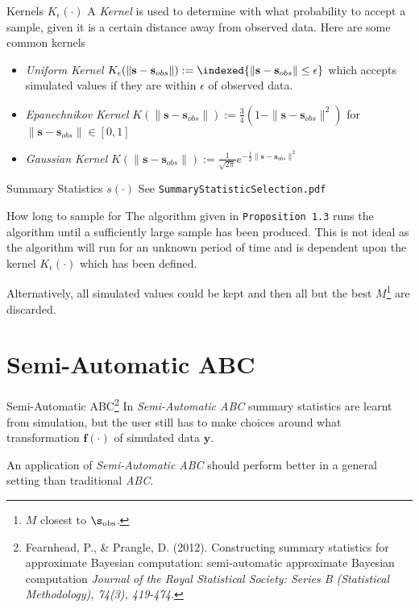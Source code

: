 \documentclass[11pt,a4paper]{article}
\begin{document}
  \begin{proposition}{Kernels $K_\epsilon(\cdot)$}
    A \textit{Kernel} is used to determine with what probability to accept a sample, given it is a certain distance away from observed data. Here are some common kernels
    \begin{itemize}
      \item \textit{Uniform Kernel} $K_\epsilon(\|\mathbf{s}-\mathbf{s}_{obs}\|):=\indexed\{\|\mathbf{s}-\mathbf{s}_{obs}\|\leq\epsilon\}$ which accepts simulated values if they are within $\epsilon$ of observed data.
      \item \textit{Epanechnikov Kernel} $K(\|\mathbf{s}-\mathbf{s}_{obs}\|):=\frac34(1-\|\mathbf{s}-\mathbf{s}_{obs}\|^2)$ for $\|\mathbf{s}-\mathbf{s}_{obs}\|\in[0,1]$
      \item \textit{Gaussian Kernel} $K(\|\mathbf{s}-\mathbf{s}_{obs}\|):=\frac1{\sqrt{2\pi}}e^{-\frac12\|\mathbf{s}-\mathbf{s}_{obs}\|^2}$
    \end{itemize}
  \end{proposition}

  \begin{proposition}{Summary Statistics $s(\cdot)$}
    See \texttt{SummaryStatisticSelection.pdf}
  \end{proposition}

  \begin{proposition}{How long to sample for}
    The algorithm given in \texttt{Proposition 1.3} runs the algorithm until a sufficiently large sample has been produced. This is not ideal as the algorithm will run for an unknown period of time and is dependent upon the kernel $K_\epsilon(\cdot)$ which has been defined.
    \par Alternatively, all simulated values could be kept and then all but the best $M$\footnote{$M$ closest to $\s_\text{obs}$.} are discarded.
  \end{proposition}

\section*{Semi-Automatic ABC}

  \begin{definition}{Semi-Automatic ABC\footnote{Fearnhead, P., & Prangle, D. (2012). Constructing summary statistics for approximate Bayesian computation: semi-automatic approximate Bayesian computation \textit{Journal of the Royal Statistical Society: Series B (Statistical Methodology), 74(3), 419-474.}}}
    In \textit{Semi-Automatic ABC} summary statistics are learnt from simulation, but the user still has to make choices around what transformation $\mathbf{f}(\cdot)$ of simulated data $\mathbf{y}$.
    \par An application of \textit{Semi-Automatic ABC} should perform better in a general setting than traditional \textit{ABC}.
  \end{definition}
\end{document}

